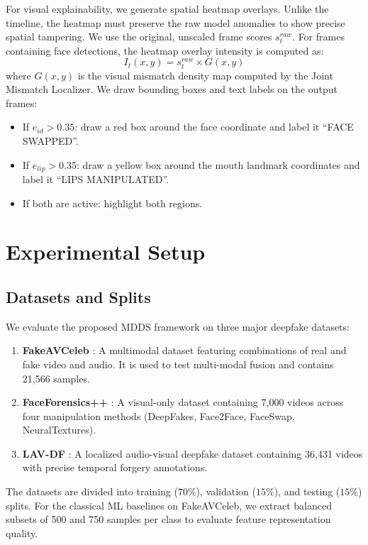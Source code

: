 \documentclass[journal,10pt,onecolumn,draftclsnofoot]{IEEEtran}
\begin{document}
For visual explainability, we generate spatial heatmap overlays. Unlike the timeline, the heatmap must preserve the raw model anomalies to show precise spatial tampering. We use the original, unscaled frame scores $s^{raw}_t$. For frames containing face detections, the heatmap overlay intensity is computed as:
\begin{equation}
    I_t(x, y) = s^{raw}_t \times G(x, y)
\end{equation}
where $G(x, y)$ is the visual mismatch density map computed by the Joint Mismatch Localizer. We draw bounding boxes and text labels on the output frames:
\begin{itemize}
    \item If $e_{id} > 0.35$: draw a red box around the face coordinate and label it ``FACE SWAPPED''.
    \item If $e_{lip} > 0.35$: draw a yellow box around the mouth landmark coordinates and label it ``LIPS MANIPULATED''.
    \item If both are active: highlight both regions.
\end{itemize}

\section{Experimental Setup}
\subsection{Datasets and Splits}
We evaluate the proposed MDDS framework on three major deepfake datasets:
\begin{enumerate}
    \item \textbf{FakeAVCeleb} \cite{khalid2021fakeavceleb}: A multimodal dataset featuring combinations of real and fake video and audio. It is used to test multi-modal fusion and contains 21,566 samples.
    \item \textbf{FaceForensics++} \cite{rossler2019faceforensics}: A visual-only dataset containing 7,000 videos across four manipulation methods (DeepFakes, Face2Face, FaceSwap, NeuralTextures).
    \item \textbf{LAV-DF} \cite{cai2022lavdf}: A localized audio-visual deepfake dataset containing 36,431 videos with precise temporal forgery annotations.
\end{enumerate}
The datasets are divided into training ($70\%$), validation ($15\%$), and testing ($15\%$) splits. For the classical ML baselines on FakeAVCeleb, we extract balanced subsets of 500 and 750 samples per class to evaluate feature representation quality.
\end{document}
